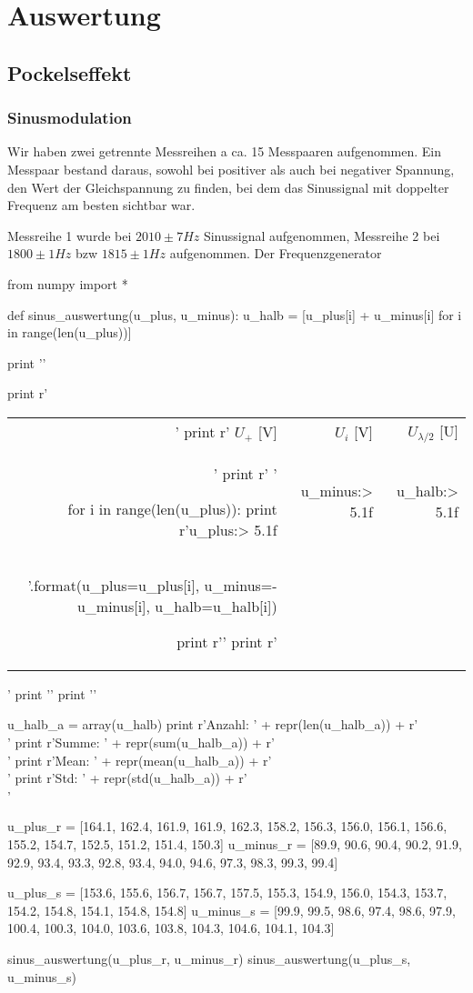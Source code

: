 \section{Auswertung}

\subsection{Pockelseffekt}

\subsubsection{Sinusmodulation}

Wir haben zwei getrennte Messreihen a ca. 15 Messpaaren aufgenommen. Ein Messpaar bestand daraus, sowohl bei positiver als auch bei negativer Spannung, den Wert der Gleichspannung zu finden, bei dem das Sinussignal mit doppelter Frequenz am besten sichtbar war.

Messreihe 1 wurde bei $2010 \pm 7 Hz$ Sinussignal aufgenommen, Messreihe 2 bei $1800 \pm 1 Hz$ bzw $1815 \pm 1 Hz$ aufgenommen. Der Frequenzgenerator

\begin{python}
from numpy import *

def sinus_auswertung(u_plus, u_minus):
  u_halb = [u_plus[i] + u_minus[i] for i in range(len(u_plus))]

  print '\n'

  print r'\begin{tabular}{rrr} \toprule'
  print r' $U_+$ [V] & $U_i$ [V] & $U_{\lambda/2}$ [U] \\'
  print r' \midrule '

  for i in range(len(u_plus)):
    print r'{u_plus:> 5.1f}&{u_minus:> 5.1f}&{u_halb:> 5.1f}\\'.format(u_plus=u_plus[i], u_minus=-u_minus[i], u_halb=u_halb[i])

  print r'\bottomrule '
  print r'\end{tabular}'
  print '\n'
  print '\n'

  u_halb_a = array(u_halb)
  print r'Anzahl: ' + repr(len(u_halb_a)) + r'\\'
  print r'Summe: ' + repr(sum(u_halb_a)) + r'\\'
  print r'Mean: ' + repr(mean(u_halb_a)) + r'\\'
  print r'Std: ' + repr(std(u_halb_a)) + r'\\'

u_plus_r  = [164.1, 162.4, 161.9, 161.9, 162.3, 158.2, 156.3, 156.0, 156.1, 156.6, 155.2, 154.7, 152.5, 151.2, 151.4, 150.3]
u_minus_r = [89.9, 90.6, 90.4, 90.2, 91.9, 92.9, 93.4, 93.3, 92.8, 93.4, 94.0, 94.6, 97.3, 98.3, 99.3, 99.4]

u_plus_s = [153.6, 155.6, 156.7, 156.7, 157.5, 155.3, 154.9, 156.0, 154.3, 153.7, 154.2, 154.8, 154.1, 154.8, 154.8]
u_minus_s = [99.9, 99.5, 98.6, 97.4, 98.6, 97.9, 100.4, 100.3, 104.0, 103.6, 103.8, 104.3, 104.6, 104.1, 104.3]  

sinus_auswertung(u_plus_r, u_minus_r)
sinus_auswertung(u_plus_s, u_minus_s)

\end{python}

